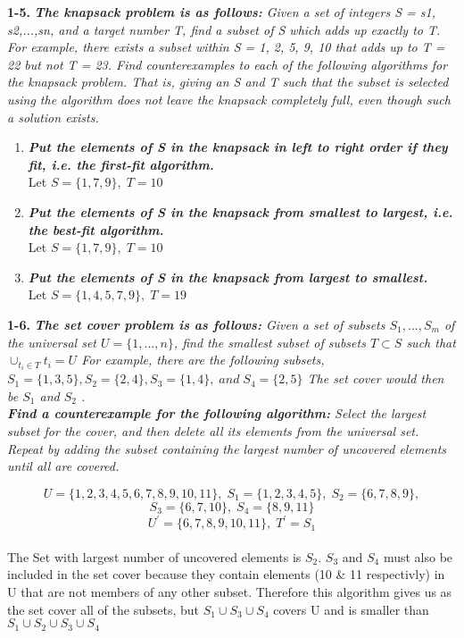 \textbf{1-5.} \emph{\textbf{The knapsack problem is as follows:} Given a set of integers S = {s1, s2,...,sn},
and a target number T, find a subset of S which adds up exactly to T. For example,
there exists a subset within S = {1, 2, 5, 9, 10} that adds up to T = 22 but not
T = 23.
Find counterexamples to each of the following algorithms for the knapsack problem.
That is, giving an S and T such that the subset is selected using the algorithm does
not leave the knapsack completely full, even though such a solution exists.}
	
\begin{enumerate}[label=(\alph*)]
\itemsep1pt\parskip0pt
	\item{\emph{\textbf{Put the elements of S in the knapsack in left to right order if they fit, i.e. the first-fit algorithm.}} \\
		Let $S = \{1,7,9\}, \; T = 10$
	}
	\item{\emph{\textbf{Put the elements of S in the knapsack from smallest to largest, i.e. the best-fit algorithm.}} \\
		Let $S = \{1,7,9\}, \; T = 10$
	}
	\item{\emph{\textbf{Put the elements of S in the knapsack from largest to smallest.}} \\
		Let $S = \{1,4,5,7,9\}, \; T = 19$
	}
\end{enumerate}


\textbf{1-6.} \emph{\textbf{The set cover problem is as follows: } Given a set of subsets $S_{1}, ..., S_{m}$ of the universal set 
	$U = \{1, ..., n\}$, 
	find the smallest subset of subsets 
	$T \subset S$ 
	such that  
	$\cup_{t_{i} \in T}t_{i} = U$ For example, there are the following subsets, $S_{1} = \{1, 3, 5\}, S_{2} = \{2, 4\}, S_{3} = \{1, 4\}, \; and \; S_{4} = \{2, 5\}$ The set cover would then be $S_{1}$ and $S_{2}$ . } \\

\emph{\textbf{Find a counterexample for the following algorithm:} Select the largest subset for the cover, and then delete all its elements from the universal set. Repeat by adding the subset containing the largest number of uncovered elements until all are covered.}

\begin{center}
	$$U = \{1,2,3,4,5,6,7,8,9,10,11\}, \; S_{1} = \{1,2,3,4,5\}, \; S_{2} = \{6,7,8,9\}, $$
    $$S_{3} = \{6,7,10\}, \; S_{4} = \{8,9,11\}$$ 
	$$U^{'} = \{6,7,8,9,10,11\}, \; T^{'} = S_{1}$$ \\
	The Set with largest number of uncovered elements is $S_{2}$. $S_{3}$ and $S_{4}$ must also be included in the set cover because they contain elements (10 \& 11 respectivly)
	in U that are not members of any other subset. Therefore this algorithm gives us as the set cover all of the subsets, but $S_{1} \cup S_{3} \cup S_{4}$ covers U and is smaller
	than $S_{1} \cup S_{2} \cup S_{3} \cup S_{4}$
\end{center}

